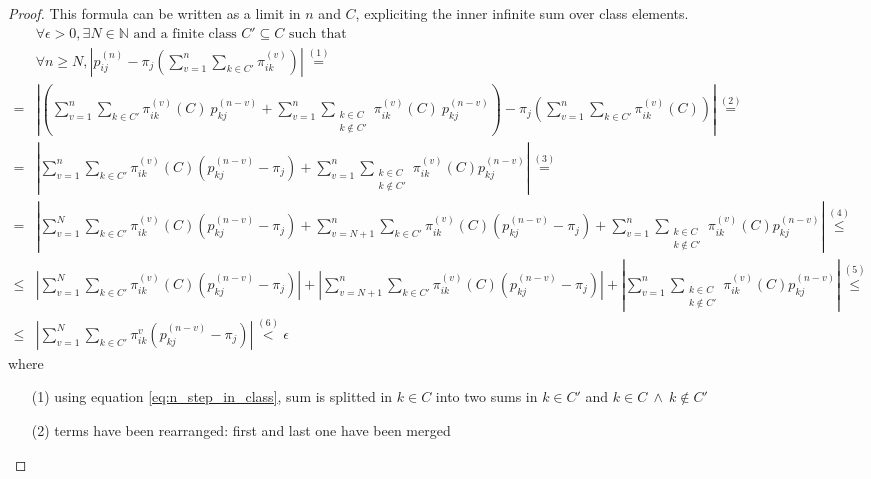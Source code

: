 \begin{proof}
		This formula can be written as a limit in $n$ and $C$, expliciting the inner infinite sum over class elements.
		\begin{equation}\begin{split} \label{eq:theorem_3.1_first term}
			& \forall \epsilon > 0, \exists N \in \mathbb{N} \text{ and a finite class } C' \subseteq C \text{ such that } \\
			& \forall n \ge N, \left| p_{ij}^{(n)} - \pi_j \left( \sum_{v = 1}^{n} \sum_{k \in C'} \pi_{ik}^{(v)} \right) \right| \stackrel{(1)}{=}
			\\
			= & \left|
				\left(
					\sum_{v = 1}^{n} \sum_{k \in C'} \pi_{ik}^{(v)}(C) ~ p_{kj}^{(n-v)} + \sum_{v = 1}^{n} \sum_{\substack{k \in C \\ k \notin C'}} \pi_{ik}^{(v)}(C) ~ p_{kj}^{(n-v)} \right)
				- \pi_j \left( \sum_{v = 1}^{n} \sum_{k \in C'} \pi_{ik}^{(v)}(C) \right)
				\right| \stackrel{(2)}{=}
			\\
			= & \left| \sum_{v = 1}^{n} \sum_{k \in C'} \pi_{ik}^{(v)}(C) (p_{kj}^{(n-v)} - \pi_j)
				+ \sum_{v = 1}^{n} \sum_{\substack{k \in C \\ k \notin C'}} \pi_{ik}^{(v)}(C) p_{kj}^{(n-v)} \right| \stackrel{(3)}{=}
			\\
			= & \left| \sum_{v = 1}^{N} \sum_{k \in C'} \pi_{ik}^{(v)}(C) (p_{kj}^{(n-v)} - \pi_j) +
				\sum_{v = N+1}^{n} \sum_{k \in C'} \pi_{ik}^{(v)}(C) (p_{kj}^{(n-v)} - \pi_j) +
				\sum_{v = 1}^{n} \sum_{\substack{k \in C \\ k \notin C'}} \pi_{ik}^{(v)}(C) p_{kj}^{(n-v)} \right| \stackrel{(4)}{\le}
			\\
			\le & \left| \sum_{v = 1}^{N} \sum_{k \in C'} \pi_{ik}^{(v)}(C) (p_{kj}^{(n-v)} - \pi_j) \right| +
				\left| \sum_{v = N+1}^{n} \sum_{k \in C'} \pi_{ik}^{(v)}(C) (p_{kj}^{(n-v)} - \pi_j) \right| +
				\left| \sum_{v = 1}^{n} \sum_{\substack{k \in C \\ k \notin C'}} \pi_{ik}^{(v)}(C) p_{kj}^{(n-v)} \right| \stackrel{(5)}{\le}
			\\
			\le & \left| \sum_{v = 1}^{N} \sum_{k \in C'} \pi_{ik}^v (p_{kj}^{(n-v)} - \pi_j) \right| \stackrel{(6)}{<} \epsilon
		\end{split}\end{equation}
		where
		\begin{itemize}
			\item [(1)] using equation \ref{eq:n_step_in_class}, sum is splitted in $k \in C$ into two sums in $k \in C'$ and $k \in C ~ \wedge ~ k \notin C' $
			\item [(2)] terms have been rearranged: first and last one have been merged

\end{itemize}
\end{proof}
